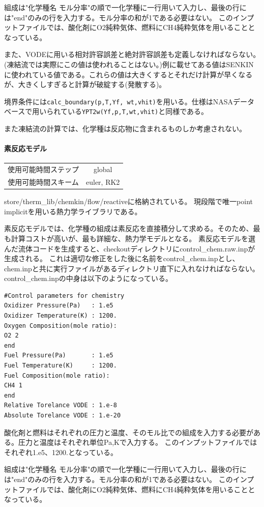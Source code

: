 \documentclass{jsarticle}
\begin{document}
組成は"化学種名 モル分率"の順で一化学種に一行用いて入力し、最後の行には"end"のみの行を入力する。モル分率の和が1である必要はない。
このインプットファイルでは、酸化剤にO2純粋気体、燃料にCH4純粋気体を用いることとなっている。

また、VODEに用いる相対許容誤差と絶対許容誤差も定義しなければならない。(凍結流では実際にこの値は使われることはない。)例に載せてある値はSENKINに使われている値である。これらの値は大きくするとそれだけ計算が早くなるが、大きくしすぎると計算が破綻する(発散する)。

境界条件には\verb|calc_boundary(p,T,Yf, wt,vhit)|を用いる。仕様はNASAデータベースで用いられている\verb|YPT2w(Yf,p,T,wt,vhit)|と同様である。

また凍結流の計算では、化学種は反応物に含まれるものしか考慮されない。
\paragraph{素反応モデル}%
\begin{center}
\begin{tabular}{c||c}\hline
使用可能時間ステップ & global\\
使用可能時間スキーム & euler, RK2\\
\hline
\end{tabular}
\end{center}
store/therm\_lib/chemkin/flow/reactiveに格納されている。
現段階で唯一point implicitを用いる熱力学ライブラリである。

素反応モデルでは、化学種の組成は素反応を直接積分して求める。そのため、最も計算コストが高いが、最も詳細な、熱力学モデルとなる。
素反応モデルを選んだ流体コードを生成すると、checkoutディレクトリにcontrol\_chem.raw.inpが生成される。
これは適切な修正をした後に名前をcontrol\_chem.inpとし、chem.inpと共に実行ファイルがあるディレクトリ直下に入れなければならない。
control\_chem.inpの中身は以下のようになっている。
\begin{verbatim}
#Control parameters for chemistry
Oxidizer Pressure(Pa)   : 1.e5
Oxidizer Temperature(K) : 1200.
Oxygen Composition(mole ratio):
O2 2
end
Fuel Pressure(Pa)       : 1.e5
Fuel Temperature(K)     : 1200.
Fuel Composition(mole ratio):
CH4 1
end
Relative Torelance VODE : 1.e-8
Absolute Torelance VODE : 1.e-20
\end{verbatim}
酸化剤と燃料はそれぞれの圧力と温度、そのモル比での組成を入力する必要がある。圧力と温度はそれぞれ単位Pa,Kで入力する。
このインプットファイルではそれぞれ1.e5、1200.となっている。

組成は"化学種名 モル分率"の順で一化学種に一行用いて入力し、最後の行には"end"のみの行を入力する。モル分率の和が1である必要はない。
このインプットファイルでは、酸化剤にO2純粋気体、燃料にCH4純粋気体を用いることとなっている。
\end{document}

